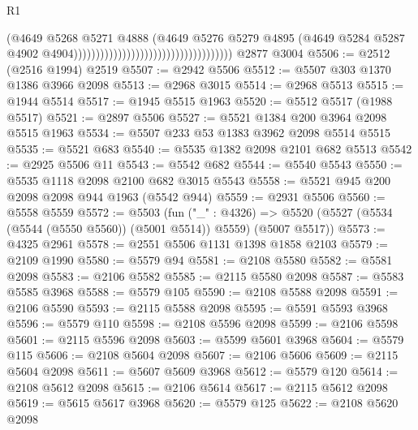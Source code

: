 \begin{lexlean}{R1}
\begin{coremodule}
                                                                      (@4649
                                                                        @5268
                                                                        @5271
                                                                        @4888
                                                                        (@4649
                                                                          @5276
                                                                          @5279
                                                                          @4895
                                                                          (@4649
                                                                            @5284
                                                                            @5287
                                                                            @4902
                                                                            @4904))))))))))))))))))))))))))))))))))))
    @2877
    @3004
@5506 := @2512 (@2516 @1994) @2519
@5507 := @2942 @5506
@5512 := @5507 @303 @1370 @1386 @3966 @2098
@5513 := @2968 @3015
@5514 := @2968 @5513
@5515 := @1944 @5514
@5517 := @1945 @5515 @1963
@5520 := @5512 @5517 (@1988 @5517)
@5521 := @2897 @5506
@5527 := @5521 @1384 @200 @3964 @2098 @5515 @1963
@5534 := @5507 @233 @53 @1383 @3962 @2098 @5514 @5515
@5535 := @5521 @683
@5540 := @5535 @1382 @2098 @2101 @682 @5513
@5542 := @2925 @5506 @11
@5543 := @5542 @682
@5544 := @5540 @5543
@5550 := @5535 @1118 @2098 @2100 @682 @3015 @5543
@5558 := @5521 @945 @200 @2098 @2098 @944 @1963 (@5542 @944)
@5559 := @2931 @5506
@5560 := @5558 @5559
@5572 := @5503
    (fun ("_" : @4326) =>
    @5520 (@5527 (@5534 (@5544 (@5550 @5560)) (@5001 @5514)) @5559) (@5007 @5517))
@5573 := @4325 @2961
@5578 := @2551 @5506 @1131 @1398 @1858 @2103
@5579 := @2109 @1990
@5580 := @5579 @94
@5581 := @2108 @5580
@5582 := @5581 @2098
@5583 := @2106 @5582
@5585 := @2115 @5580 @2098
@5587 := @5583 @5585 @3968
@5588 := @5579 @105
@5590 := @2108 @5588 @2098
@5591 := @2106 @5590
@5593 := @2115 @5588 @2098
@5595 := @5591 @5593 @3968
@5596 := @5579 @110
@5598 := @2108 @5596 @2098
@5599 := @2106 @5598
@5601 := @2115 @5596 @2098
@5603 := @5599 @5601 @3968
@5604 := @5579 @115
@5606 := @2108 @5604 @2098
@5607 := @2106 @5606
@5609 := @2115 @5604 @2098
@5611 := @5607 @5609 @3968
@5612 := @5579 @120
@5614 := @2108 @5612 @2098
@5615 := @2106 @5614
@5617 := @2115 @5612 @2098
@5619 := @5615 @5617 @3968
@5620 := @5579 @125
@5622 := @2108 @5620 @2098

\end{coremodule}
\end{lexlean}
